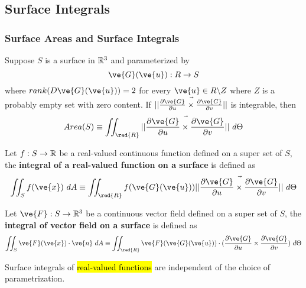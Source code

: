 \documentclass[11pt]{article}
\begin{document}
		\subsection{Surface Integrals}
			\subsubsection{Surface Areas and Surface Integrals}
				\begin{definition}
					Suppose $S$ is a surface in $\mathbb{R}^3$ and parameterized by
					\begin{equation}
						\ve{G}(\ve{u}): R \to S
					\end{equation}
					where $rank(D\ve{G}(\ve{u}))=2$ for every $\ve{u} \in R \backslash Z$ where $Z$ is a probably empty set with zero content. If $\norm{\pd{\ve{G}}{u} \times \pd{\ve{G}}{v}}$ is integrable, then
					\begin{equation}
						Area(S) \equiv \iint_{\red{R}} \norm{\pd{\ve{G}}{u} \times \pd{\ve{G}}{v}}\ d\Theta
					\end{equation}
				\end{definition}
				
				\begin{definition}
					Let $f: S \to \mathbb{R}$ be a real-valued continuous function defined on a super set of $S$, the \textbf{integral of a real-valued function on a surface} is defined as
					\begin{equation}
						\iint_{S}f(\ve{x})\ dA 
						\equiv \iint_{\red{R}} f(\ve{G}(\ve{u}))\norm{\pd{\ve{G}}{u} \times \pd{\ve{G}}{v}}\ d\Theta
					\end{equation}
				\end{definition}
				
				\begin{definition}
					Let $\ve{F}: S \to \R^3$ be a continuous vector field defined on a super set of $S$, the \textbf{integral of vector field on a surface} is defined as
					\begin{equation}
						\iint_{S}\ve{F}(\ve{x}) \cdot \ve{n}\ dA
						\equiv \iint_{\red{R}} \ve{F}(\ve{G}(\ve{u}))\cdot (\pd{\ve{G}}{u} \times \pd{\ve{G}}{v})\ d\Theta
					\end{equation} 
				\end{definition}
				
				\begin{remark}
					Surface integrals of \hl{real-valued functions} are independent of the choice of parametrization.
				\end{remark}
				
\end{document}
